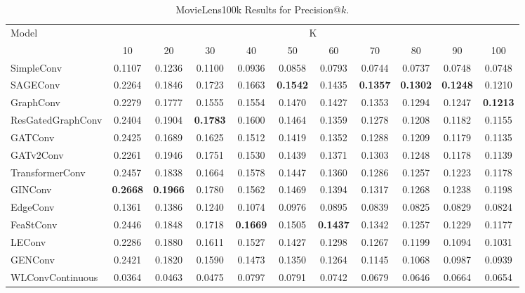 \documentclass[bst/sn-nature]{sn-jnl}
\begin{document}
\begin{appendices}
\begin{table}[htbp]
    \centering 
    \begin{tabular}{|l|*{10}{c|}}
    \hline
    \multirow{2}{*}{Model} & \multicolumn{10}{c|}{K} \\
    \hhline{~*{10}{|-}|}
                             & 10    & 20    & 30    & 40    & 50    & 60    & 70    & 80    & 90    & 100   \\ \hline
    \rowcolor[gray]{0.9} SimpleConv               & 0.1107 & 0.1236 & 0.1100 & 0.0936 & 0.0858 & 0.0793 & 0.0744 & 0.0737 & 0.0748 & 0.0748 \\ 
    SAGEConv                 & 0.2264 & 0.1846 & 0.1723 & 0.1663 & \textbf{0.1542} & 0.1435 & \textbf{0.1357} & \textbf{0.1302} & \textbf{0.1248} & 0.1210 \\ 
    \rowcolor[gray]{0.9} GraphConv                & 0.2279 & 0.1777 & 0.1555 & 0.1554 & 0.1470 & 0.1427 & 0.1353 & 0.1294 & 0.1247 & \textbf{0.1213} \\ 
    ResGatedGraphConv        & 0.2404 & 0.1904 & \textbf{0.1783} & 0.1600 & 0.1464 & 0.1359 & 0.1278 & 0.1208 & 0.1182 & 0.1155 \\ 
    \rowcolor[gray]{0.9} GATConv                  & 0.2425 & 0.1689 & 0.1625 & 0.1512 & 0.1419 & 0.1352 & 0.1288 & 0.1209 & 0.1179 & 0.1135 \\ 
    GATv2Conv                & 0.2261 & 0.1946 & 0.1751 & 0.1530 & 0.1439 & 0.1371 & 0.1303 & 0.1248 & 0.1178 & 0.1139 \\ 
    \rowcolor[gray]{0.9} TransformerConv          & 0.2457 & 0.1838 & 0.1664 & 0.1578 & 0.1447 & 0.1360 & 0.1286 & 0.1257 & 0.1223 & 0.1178 \\ 
    GINConv                  & \textbf{0.2668} & \textbf{0.1966} & 0.1780 & 0.1562 & 0.1469 & 0.1394 & 0.1317 & 0.1268 & 0.1238 & 0.1198 \\ 
    \rowcolor[gray]{0.9} EdgeConv                 & 0.1361 & 0.1386 & 0.1240 & 0.1074 & 0.0976 & 0.0895 & 0.0839 & 0.0825 & 0.0829 & 0.0824 \\ 
    FeaStConv                & 0.2446 & 0.1848 & 0.1718 & \textbf{0.1669} & 0.1505 & \textbf{0.1437} & 0.1342 & 0.1257 & 0.1229 & 0.1177 \\ 
    \rowcolor[gray]{0.9} LEConv                   & 0.2286 & 0.1880 & 0.1611 & 0.1527 & 0.1427 & 0.1298 & 0.1267 & 0.1199 & 0.1094 & 0.1031 \\ 
    GENConv                  & 0.2421 & 0.1820 & 0.1590 & 0.1473 & 0.1350 & 0.1264 & 0.1145 & 0.1068 & 0.0987 & 0.0939 \\ 
    \rowcolor[gray]{0.9} WLConvContinuous         & 0.0364 & 0.0463 & 0.0475 & 0.0797 & 0.0791 & 0.0742 & 0.0679 & 0.0646 & 0.0664 & 0.0654 \\ \hline
    \end{tabular}
    \caption{MovieLens100k Results for Precision@$k$.}
    \label{tab:precision}
\end{table}


\end{appendices}
\end{document}
